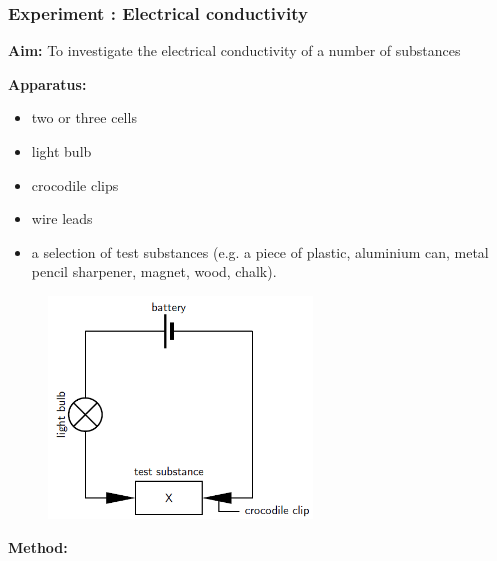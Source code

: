             \subsubsection{ Experiment : Electrical conductivity }
            \nopagebreak
            \label{m38706*id66151}\noindent{}\textbf{Aim:}
        \newline
To investigate the electrical conductivity of a number of substances\par 
      \label{m38706*id66166}\noindent{}\textbf{Apparatus:}
        \newline
      \label{m38706*id66175}\begin{itemize}[noitemsep]
            \label{m38706*uid95}\item two or three cells
\label{m38706*uid96}\item light bulb
\label{m38706*uid97}\item crocodile clips
\label{m38706*uid98}\item wire leads
\label{m38706*uid99}\item a selection of test substances (e.g. a piece of plastic, aluminium can, metal pencil sharpener, magnet, wood, chalk).
\end{itemize}
        \par 
      \label{m38706*id66241}
    \setcounter{subfigure}{0}
	\begin{figure}[H] %
    \begin{center}
    \label{m38706*id66244!!!underscore!!!media}\label{m38706*id66244!!!underscore!!!printimage}\includegraphics[width=7cm]{col11305.imgs/m38706_CG10C1_006.png} %
      \vspace{2pt}
    \vspace{.1in}
    \end{center}
 \end{figure}       
      \par 
      \label{m38706*id66251}\noindent{}\textbf{Method:}
